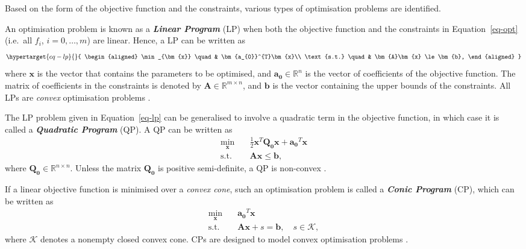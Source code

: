 \documentclass[11pt,a4paper,]{article}
\begin{document}
Based on the form of the objective function and the constraints, various
types of optimisation problems are identified.

An optimisation problem is known as a \textbf{\emph{Linear Program}}
(LP) when both the objective function and the constraints in
Equation~\ref{eq-opt} (i.e.~all \(f_{i}\), \(i = 0, \dots, m\)) are
linear. Hence, a LP can be written as
\begin{equation}\protect\hypertarget{eq-lp}{}{
\begin{aligned}
  \min_{\bm{x}} \quad & \bm{a_{0}}^{T}\bm{x}\\
  \text{s.t.} \quad & \bm{A}\bm{x} \le \bm{b},
\end{aligned}
}\label{eq-lp}\end{equation} where \(\bm{x}\) is the vector that
contains the parameters to be optimised, and
\(\bm{a_{0}} \in \mathbb{R}^{n}\) is the vector of coefficients of the
objective function. The matrix of coefficients in the constraints is
denoted by \(\bm{A} \in \mathbb{R}^{m \times n}\), and \(\bm{b}\) is the
vector containing the upper bounds of the constraints. All LPs are
\emph{convex} optimisation problems \autocite{Theusl2020}.

The LP problem given in Equation~\ref{eq-lp} can be generalised to
involve a quadratic term in the objective function, in which case it is
called a \textbf{\emph{Quadratic Program}} (QP). A QP can be written as
\[
\begin{aligned}
  \min_{\bm{x}} \quad & \frac{1}{2} \bm{x}^{T} \bm{Q_{0}} \bm{x} + \bm{a_{0}}^{T}\bm{x}\\
  \text{s.t.} \quad & \bm{A}\bm{x} \le \bm{b},
\end{aligned}
\] where \(\bm{Q_{0}} \in \mathbb{R}^{n \times n}\). Unless the matrix
\(\bm{Q_{0}}\) is positive semi-definite, a QP is non-convex
\autocite{Theusl2020}.

If a linear objective function is minimised over a \emph{convex cone},
such an optimisation problem is called a \textbf{\emph{Conic Program}}
(CP), which can be written as \[
\begin{aligned}
  \min_{\bm{x}} \quad & \bm{a_{0}}^{T}\bm{x} \\
  \text{s.t.} \quad & \bm{A}\bm{x} + s = \bm{b}, \quad s \in \mathcal{K},
\end{aligned}
\] where \(\mathcal{K}\) denotes a nonempty closed convex cone. CPs are
designed to model convex optimisation problems \autocite{Theusl2020}.
\end{document}
